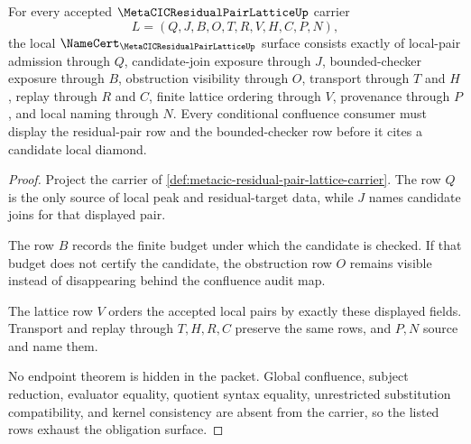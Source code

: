 \begin{theorem}
\label{thm:metacic-residual-pair-lattice-obligations}
For every accepted $\MetaCICResidualPairLatticeUp$ carrier
$$
L=(Q,J,B,O,T,R,V,H,C,P,N),
$$
the local $\NameCert_{\MetaCICResidualPairLatticeUp}$ surface consists exactly of local-pair admission through $Q$, candidate-join exposure through $J$, bounded-checker exposure through $B$, obstruction visibility through $O$, transport through $T$ and $H$, replay through $R$ and $C$, finite lattice ordering through $V$, provenance through $P$, and local naming through $N$. Every conditional confluence consumer must display the residual-pair row and the bounded-checker row before it cites a candidate local diamond.
\end{theorem}
\begin{proof}
Project the carrier of \autoref{def:metacic-residual-pair-lattice-carrier}. The row $Q$ is the only source of local peak and residual-target data, while $J$ names candidate joins for that displayed pair.

The row $B$ records the finite budget under which the candidate is checked. If that budget does not certify the candidate, the obstruction row $O$ remains visible instead of disappearing behind the confluence audit map.

The lattice row $V$ orders the accepted local pairs by exactly these displayed fields. Transport and replay through $T,H,R,C$ preserve the same rows, and $P,N$ source and name them.

No endpoint theorem is hidden in the packet. Global confluence, subject reduction, evaluator equality, quotient syntax equality, unrestricted substitution compatibility, and kernel consistency are absent from the carrier, so the listed rows exhaust the obligation surface.
\end{proof}

